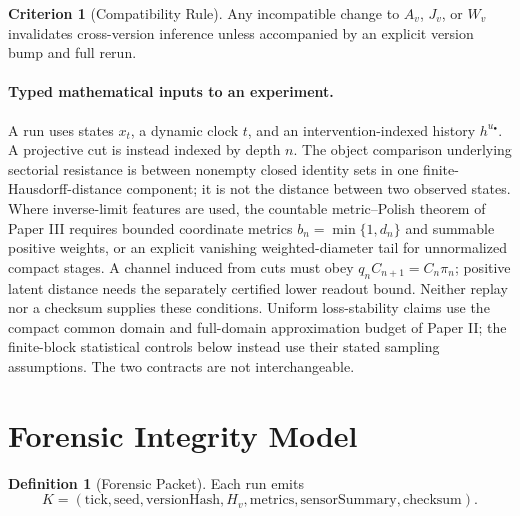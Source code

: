 \documentclass[11pt,a4paper]{article}
\theoremstyle{definition}
\newtheorem{definition}[theorem]{Definition}
\newtheorem{criterion}[theorem]{Criterion}
\begin{document}
\begin{criterion}[Compatibility Rule]
Any incompatible change to $A_v$, $J_v$, or $W_v$ invalidates cross-version inference unless accompanied by an explicit version bump and full rerun.
\end{criterion}

\paragraph{Typed mathematical inputs to an experiment.}
A run uses states $x_t$, a dynamic clock $t$, and an intervention-indexed
history $h^{u_\bullet}$. A projective cut is instead indexed by depth $n$.
The object comparison underlying sectorial resistance is between nonempty
closed identity sets in one finite-Hausdorff-distance component; it is not
the distance between two observed states. Where inverse-limit features are
used, the countable metric--Polish theorem of Paper III requires bounded
coordinate metrics $b_n=\min\{1,d_n\}$ and summable positive weights, or an
explicit vanishing weighted-diameter tail for unnormalized compact stages.
A channel induced from cuts must obey $q_nC_{n+1}=C_n\pi_n$; positive latent
distance needs the separately certified lower readout bound. Neither replay
nor a checksum supplies these conditions. Uniform loss-stability claims use
the compact common domain and full-domain approximation budget of Paper II;
the finite-block statistical controls below instead use their stated sampling
assumptions. The two contracts are not interchangeable.

\section{Forensic Integrity Model}
\begin{definition}[Forensic Packet]
Each run emits
\[
K=(\text{tick},\text{seed},\text{versionHash},H_v,\text{metrics},\text{sensorSummary},\text{checksum}).
\]
\end{definition}
\end{document}
